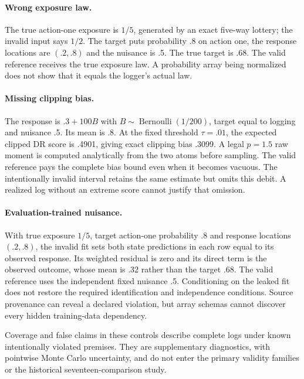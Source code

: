\paragraph{Wrong exposure law.}
The true action-one exposure is $1/5$, generated by an exact five-way lottery;
the invalid input says $1/2$. The target puts probability .8 on action one,
the response locations are $(.2,.8)$ and the nuisance is .5. The true target is
.68. The valid reference receives the true exposure law. A probability array
being normalized does not show that it equals the logger's actual law.

\paragraph{Missing clipping bias.}
The response is $.3+100B$ with $B\sim\operatorname{Bernoulli}(1/200)$,
target equal to logging and nuisance .5. Its mean is .8. At the fixed threshold
$\tau=.01$, the expected clipped DR score is .4901, giving exact clipping
bias .3099. A legal $p=1.5$ raw moment is computed analytically from the two
atoms before sampling. The valid reference pays the complete bias bound even
when it becomes vacuous. The intentionally invalid interval retains the same
estimate but omits this debit. A realized log without an extreme score cannot
justify that omission.

\paragraph{Evaluation-trained nuisance.}
With true exposure $1/5$, target action-one probability .8 and response
locations $(.2,.8)$, the invalid fit sets both state predictions in each row
equal to its observed response. Its weighted residual is zero and its direct
term is the observed outcome, whose mean is .32 rather than the target .68.
The valid reference uses the independent fixed nuisance .5. Conditioning on
the leaked fit does not restore the required identification and independence
conditions. Source provenance can reveal a declared violation, but array
schemas cannot discover every hidden training-data dependency.

Coverage and false claims in these controls describe complete logs under
known intentionally violated premises. They are supplementary diagnostics,
with pointwise Monte Carlo uncertainty, and do not enter the primary validity
families or the historical seventeen-comparison study.
